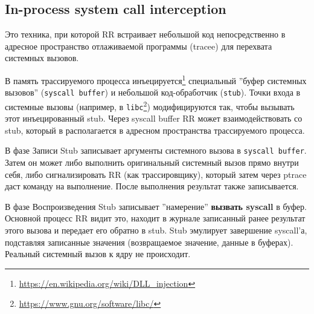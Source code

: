 


\subsection{In-process system call interception}


Это техника, при которой RR встраивает небольшой код непосредственно
в адресное пространство отлаживаемой программы (tracee) для перехвата системных
вызовов.

В память трассируемого процесса
инъецируется\footnote{\url{https://en.wikipedia.org/wiki/DLL_injection}}
специальный ''буфер системных вызовов'' (\texttt{syscall buffer}) и небольшой
код-обработчик (\texttt{stub}). Точки входа в системные вызовы (например, в
\texttt{libc}\footnote{\url{https://www.gnu.org/software/libc/}})
модифицируются так, чтобы вызывать этот инъецированный stub. Через syscall
buffer RR может взаимодействовать со stub, который в располагается в адресном
пространства трассируемого процесса.

В фазе Записи Stub записывает аргументы системного вызова в \texttt{syscall
buffer}. Затем он может либо выполнить оригинальный системный вызов прямо
внутри себя, либо сигнализировать RR (как трассировщику), который затем через
ptrace даст команду на выполнение. После выполнения результат также
записывается.

В фазе Воспроизведения Stub записывает ''намерение'' \textbf{вызвать syscall} в буфер.
Основной процесс RR видит это, находит в журнале записанный ранее результат этого
вызова и передает его обратно в stub. Stub эмулирует завершение syscall'а,
подставляя записанные значения (возвращаемое значение, данные в буферах).
Реальный системный вызов к ядру не происходит.

